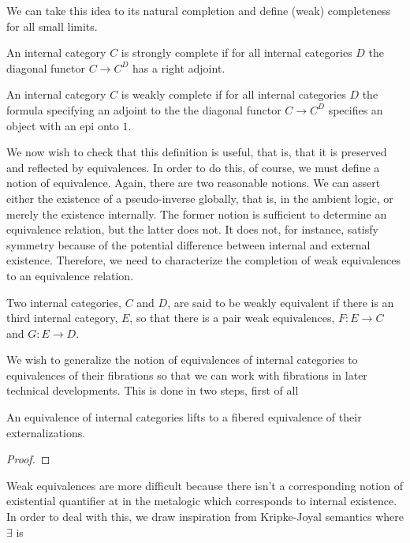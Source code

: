 We can take this idea to its natural completion and define (weak)
completeness for all small limits.
\begin{defn}\label{defn:complete:complete}
  An internal category $C$ is strongly complete if for all internal
  categories $D$ the diagonal functor $C \to C^D$ has a right
  adjoint.
\end{defn}
\begin{defn}\label{defn:complete:weakcompletebroken}
  An internal category $C$ is weakly complete if for all internal
  categories $D$ the formula specifying an adjoint to the the diagonal
  functor $C \to C^D$ specifies an object with an epi onto $1$.
\end{defn}
We now wish to check that this definition is useful, that is, that it
is preserved and reflected by equivalences. In order to do this, of
course, we must define a notion of equivalence. Again, there are two
reasonable notions. We can assert either the existence of a
pseudo-inverse globally, that is, in the ambient logic, or merely the
existence internally. The former notion is sufficient to determine an
equivalence relation, but the latter does not. It does not, for
instance, satisfy symmetry because of the potential difference between
internal and external existence. Therefore, we need to characterize
the completion of weak equivalences to an equivalence relation.
\begin{defn}\label{defn:complete:weakequivalence}
  Two internal categories, $C$ and $D$, are said to be weakly
  equivalent if there is an third internal category, $E$, so that
  there is a pair weak equivalences, $F : E \to C$ and $G : E \to D$.
\end{defn}
We wish to generalize the notion of equivalences of internal
categories to equivalences of their fibrations so that we can work
with fibrations in later technical developments. This is done in two
steps, first of all
\begin{thm}\label{thm:complete:equivalencelifts}
  An equivalence of internal categories lifts to a fibered equivalence
  of their externalizations.
\end{thm}
\begin{proof}
\end{proof}
Weak equivalences are more difficult because there isn't a
corresponding notion of existential quantifier at in the metalogic
which corresponds to internal existence. In order to deal with this,
we draw inspiration from Kripke-Joyal semantics where $\exists$ is
